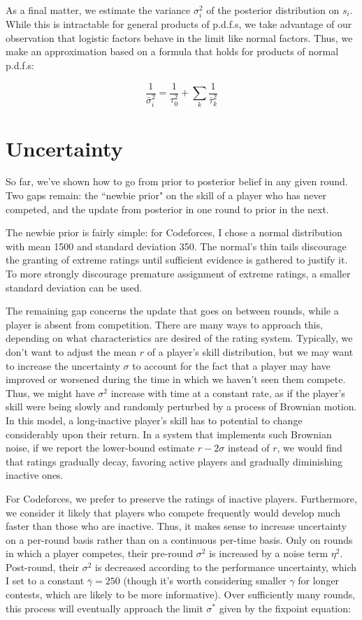 \documentclass{article}
\begin{document}
As a final matter, we estimate the variance $\sigma_i^2$ of the posterior distribution on $s_i$. While this is intractable for general products of p.d.f.s, we take advantage of our observation that logistic factors behave in the limit like normal factors. Thus, we make an approximation based on a formula that holds for products of normal p.d.f.s:

\[\frac{1}{\bar\sigma_i^2} = \frac{1}{\tau_0^2} + \sum_k \frac{1}{\bar\tau_k^2}\]

\section{Uncertainty}

So far, we've shown how to go from prior to posterior belief in any given round. Two gaps remain: the ``newbie prior" on the skill of a player who has never competed, and the update from posterior in one round to prior in the next.

The newbie prior is fairly simple: for Codeforces, I chose a normal distribution with mean 1500 and standard deviation 350. The normal's thin tails discourage the granting of extreme ratings until sufficient evidence is gathered to justify it. To more strongly discourage premature assignment of extreme ratings, a smaller standard deviation can be used.

The remaining gap concerns the update that goes on between rounds, while a player is absent from competition. There are many ways to approach this, depending on what characteristics are desired of the rating system. Typically, we don't want to adjust the mean $r$ of a player's skill distribution, but we may want to increase the uncertainty $\sigma$ to account for the fact that a player may have improved or worsened during the time in which we haven't seen them compete. Thus, we might have $\sigma^2$ increase with time at a constant rate, as if the player's skill were being slowly and randomly perturbed by a process of Brownian motion. In this model, a long-inactive player's skill has to potential to change considerably upon their return. In a system that implements such Brownian noise, if we report the lower-bound estimate $r-2\sigma$ instead of $r$, we would find that ratings gradually decay, favoring active players and gradually diminishing inactive ones.

For Codeforces, we prefer to preserve the ratings of inactive players. Furthermore, we consider it likely that players who compete frequently would develop much faster than those who are inactive. Thus, it makes sense to increase uncertainty on a per-round basis rather than on a continuous per-time basis. Only on rounds in which a player competes, their pre-round $\sigma^2$ is increased by a noise term $\eta^2$. Post-round, their $\sigma^2$ is decreased according to the performance uncertainty, which I set to a constant $\bar\gamma = 250$ (though it's worth considering smaller $\gamma$ for longer contests, which are likely to be more informative). Over sufficiently many rounds, this process will eventually approach the limit $\sigma^*$ given by the fixpoint equation:
\end{document}
